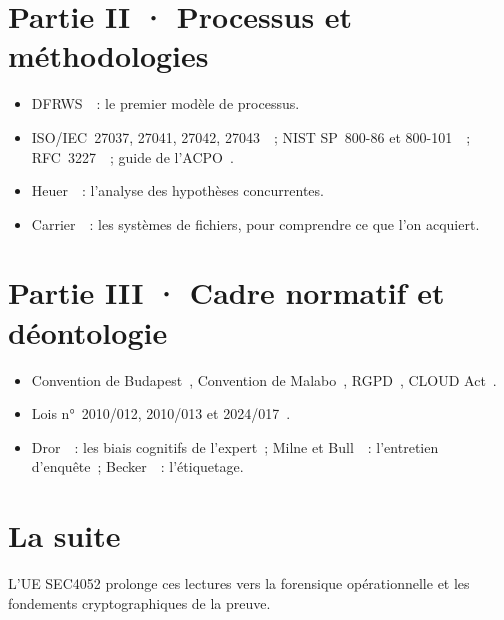 \section*{Partie II · Processus et méthodologies}
\begin{itemize}
    \item DFRWS~\cite{dfrws2001}~: le premier modèle de processus.
    \item ISO/IEC~27037, 27041, 27042, 27043~\cite{iso27037,iso27041_2015,iso27042_2015,iso27043_2015}~; NIST SP~800-86 et 800-101~\cite{nist80086,nist800101r1}~; RFC~3227~\cite{rfc3227}~; guide de l'ACPO~\cite{acpo2012}.
    \item Heuer~\cite{heuer1999}~: l'analyse des hypothèses concurrentes.
    \item Carrier~\cite{carrier2005}~: les systèmes de fichiers, pour comprendre ce que l'on acquiert.
\end{itemize}

\section*{Partie III · Cadre normatif et déontologie}
\begin{itemize}
    \item Convention de Budapest~\cite{budapest2001}, Convention de Malabo~\cite{malabo2014}, RGPD~\cite{rgpd2016}, CLOUD Act~\cite{cloudact2018}.
    \item Lois n°~2010/012, 2010/013 et 2024/017~\cite{cameroun2010a,cameroun2010b,cameroun2024donnees}.
    \item Dror~\cite{dror2020cognitive}~: les biais cognitifs de l'expert~; Milne et Bull~\cite{milne1999investigative}~: l'entretien d'enquête~; Becker~\cite{becker1963}~: l'étiquetage.
\end{itemize}

\section*{La suite}
L'UE SEC4052 prolonge ces lectures vers la forensique opérationnelle et les fondements cryptographiques de la preuve.
